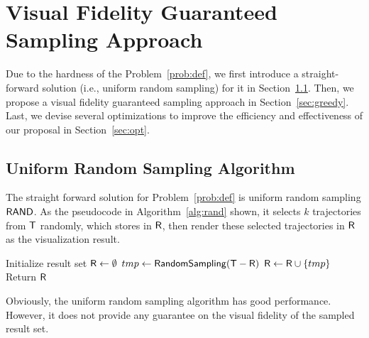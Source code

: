 \section{Visual Fidelity Guaranteed Sampling Approach}\label{sec:sol}
Due to the hardness of the Problem~\ref{prob:def}, we first introduce a straight-forward solution (i.e., uniform random sampling) for it in Section~\ref{sec:random}.
Then, we propose a visual fidelity guaranteed sampling approach in Section~\ref{sec:greedy}.
Last, we devise several optimizations to improve the efficiency and effectiveness of our proposal in Section~\ref{sec:opt}.


\subsection{Uniform Random Sampling Algorithm}\label{sec:random}
The straight forward solution for Problem~\ref{prob:def} is uniform random sampling $\mathsf{RAND}$.
As the pseudocode in Algorithm~\ref{alg:rand} shown, it selects $k$ trajectories from $\mathsf{T}$ randomly, which stores in $\mathsf{R}$,
then render these selected trajectories in $\mathsf{R}$ as the visualization result.

\begin{algorithm}
    \caption{$\rand(\D,k=\alpha |\D|)$} \label{alg:rand}
    \begin{algorithmic}[1]
    \State Initialize result set $\mathsf{R} \leftarrow \emptyset$
        \State $tmp \leftarrow \mathsf{RandomSampling(\mathsf{T}-\mathsf{R})}$
        \State $\mathsf{R} \leftarrow \mathsf{R} \cup \{ tmp \}$
    \EndWhile
    \State Return $\mathsf{R}$
    \end{algorithmic}

\end{algorithm}



Obviously, the uniform random sampling algorithm has good performance.
However, it does not provide any guarantee on the visual fidelity of the sampled result set.





